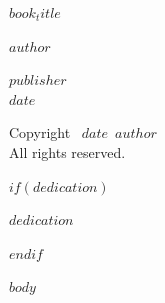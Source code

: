 \documentclass[11pt]{memoir}
\def\booktitle{$book_title$}
\def\bookauthor{$author$}
\def\bookdate{$date$}
\def\bookpublisher{$publisher$}
\begin{document}
\thispagestyle{empty}
\vspace*{0.5in}
\begin{center}
{\Large\scshape\booktitle\par}
\vspace{1in}
{\large\scshape\bookauthor\par}
\vfill
{\scshape\bookpublisher}\\
\bookdate
\end{center}

\clearpage
\thispagestyle{empty}
\vspace*{\fill}
\begin{center}
Copyright \textcopyright\ \bookdate\ \bookauthor\\
All rights reserved.
\end{center}
\vspace*{\fill}

$if(dedication)$
\clearpage
\thispagestyle{empty}
\vspace*{2in}
\begin{center}
\textit{$dedication$}
\end{center}
$endif$

\clearpage
\tableofcontents

$body$
\end{document}
